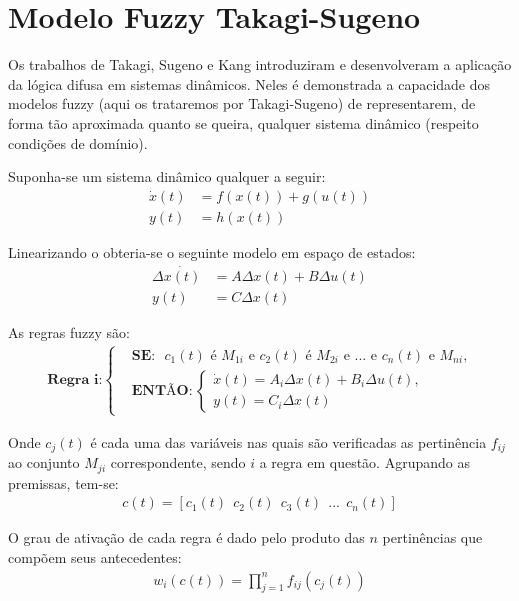 \section{Modelo Fuzzy Takagi-Sugeno} \label{secTakSug}
Os trabalhos de Takagi, Sugeno \cite{takagiSugeno} e Kang \cite{kang} introduziram e desenvolveram a aplicação da lógica difusa em sistemas dinâmicos. Neles é demonstrada a capacidade dos modelos fuzzy (aqui os trataremos por Takagi-Sugeno) de representarem, de forma tão aproximada quanto se queira, qualquer sistema dinâmico (respeito condições de domínio). 

Suponha-se um sistema dinâmico qualquer a seguir:
\begin{align*}
	\dot{x}(t) &= f(x(t)) + g(u(t)) \\
	y(t) &= h(x(t))
\end{align*}

Linearizando o obteria-se o seguinte modelo em espaço de estados:
\begin{align*}
	\Delta \dot{x(t)} &= A \Delta x(t) + B \Delta u(t) \\
	y(t) &= C \Delta x(t)
\end{align*}

As regras fuzzy são:
\begin{align} \label{eqRegraIGeral}
	\textbf{Regra i:}
	\begin{cases}
		&\textbf{SE:} \text{ $c_1(t)$ é $M_{1i}$ e $c_2(t)$ é $M_{2i}$ e ... e $c_n(t)$ e $M_{ni}$,} \\
		&\textbf{ENTÃO}:
		\begin{cases}
			 \dot{x}(t) = A_i \Delta x(t) + B_i \Delta u(t),\\
			y(t) = C_i \Delta x(t)
		\end{cases}
	\end{cases}
\end{align}

Onde $c_j(t)$ é cada uma das variáveis nas quais são verificadas as pertinência $f_{ij}$ ao conjunto $M_{ji}$ correspondente, sendo $i$ a regra em questão.  Agrupando as premissas, tem-se:
\begin{align}
	c(t) = [c_1(t) \ \ c_2(t) \ \ c_3(t) \ \ ... \ \ c_n(t)]
\end{align}
	
O grau de ativação de cada regra é dado pelo produto das $n$ pertinências que compõem seus antecedentes:  
\begin{align}
	w_i(c(t)) = \prod_{j=1}^{n} f_{ij}(c_j(t))
\end{align}

